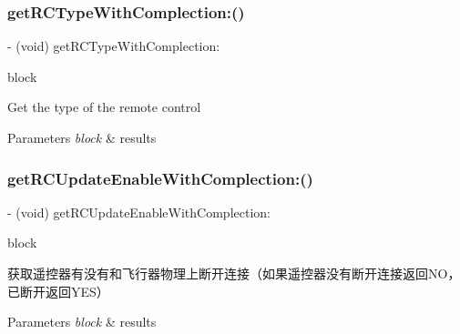\subsubsection{\texorpdfstring{get\+R\+C\+Type\+With\+Complection\+:()}{getRCTypeWithComplection:()}}
{\footnotesize\ttfamily -\/ (void) get\+R\+C\+Type\+With\+Complection\+: \begin{DoxyParamCaption}\item[{(void($^\wedge$)(P\+V\+R\+C\+Type rc\+Type, N\+S\+Error $\ast$\hyperlink{group___p_v_s_d_k___c_o_r_e___a_p_i___m_o_u_n_t_c_o_n_t_r_o_l_ga5a1de33b230662127568783314b4a54d}{\+\_\+\+Nullable} error))}]{block }\end{DoxyParamCaption}}

Get the type of the remote control


\begin{DoxyParams}{Parameters}
{\em block} & results \\
\hline
\end{DoxyParams}
\mbox{\label{interface_p_v_remote_controller_afeea774d82453518e33aeae0803ba7e2}} 
\subsubsection{\texorpdfstring{get\+R\+C\+Update\+Enable\+With\+Complection\+:()}{getRCUpdateEnableWithComplection:()}}
{\footnotesize\ttfamily -\/ (void) get\+R\+C\+Update\+Enable\+With\+Complection\+: \begin{DoxyParamCaption}\item[{(void($^\wedge$)(B\+O\+OL update\+Enable, N\+S\+Error $\ast$\hyperlink{group___p_v_s_d_k___c_o_r_e___a_p_i___m_o_u_n_t_c_o_n_t_r_o_l_ga5a1de33b230662127568783314b4a54d}{\+\_\+\+Nullable} error))}]{block }\end{DoxyParamCaption}}

获取遥控器有没有和飞行器物理上断开连接（如果遥控器没有断开连接返回\+N\+O，已断开返回\+Y\+E\+S）


\begin{DoxyParams}{Parameters}
{\em block} & results \\
\hline
\end{DoxyParams}
\mbox{\label{interface_p_v_remote_controller_a90638bb5e4658fd25ac2606b9e989770}} 
